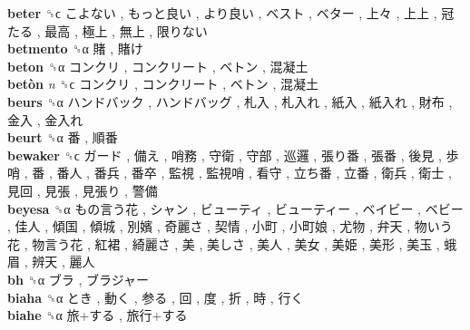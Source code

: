 \textbf{beter} ␝ϲ   こよない ,  もっと良い ,  より良い ,  ベスト ,  ベター ,  上々 ,  上上 ,  冠たる ,  最高 ,  極上 ,  無上 ,  限りない   \\
\textbf{betmento} ␝α   賭 ,  賭け   \\
\textbf{beton} ␝α   コンクリ ,  コンクリート ,  ベトン ,  混凝土   \\
\textbf{betòn} \emph{n}  ␝ϲ   コンクリ ,  コンクリート ,  ベトン ,  混凝土   \\
\textbf{beurs} ␝α   ハンドバック ,  ハンドバッグ ,  札入 ,  札入れ ,  紙入 ,  紙入れ ,  財布 ,  金入 ,  金入れ   \\
\textbf{beurt} ␝α   番 ,  順番   \\
\textbf{bewaker} ␝ϲ   ガード ,  備え ,  哨務 ,  守衛 ,  守部 ,  巡邏 ,  張り番 ,  張番 ,  後見 ,  歩哨 ,  番 ,  番人 ,  番兵 ,  番卒 ,  監視 ,  監視哨 ,  看守 ,  立ち番 ,  立番 ,  衛兵 ,  衛士 ,  見回 ,  見張 ,  見張り ,  警備   \\
\textbf{beyesa} ␝α   もの言う花 ,  シャン ,  ビューティ ,  ビューティー ,  ベイビー ,  ベビー ,  佳人 ,  傾国 ,  傾城 ,  別嬪 ,  奇麗さ ,  契情 ,  小町 ,  小町娘 ,  尤物 ,  弁天 ,  物いう花 ,  物言う花 ,  紅裙 ,  綺麗さ ,  美 ,  美しさ ,  美人 ,  美女 ,  美姫 ,  美形 ,  美玉 ,  蛾眉 ,  辨天 ,  麗人   \\
\textbf{bh} ␝α   ブラ ,  ブラジャー   \\
\textbf{biaha} ␝α   とき ,  動く ,  参る ,  回 ,  度 ,  折 ,  時 ,  行く   \\
\textbf{biahe} ␝α   旅+する ,  旅行+する   \\
